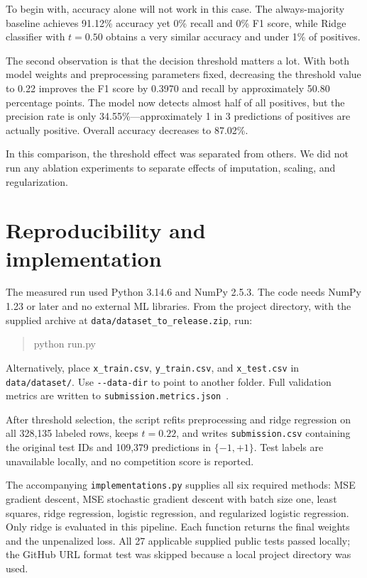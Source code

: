 \documentclass[10pt,conference,compsocconf]{IEEEtran}
\begin{document}
To begin with, accuracy alone will not work in this case. The always-majority baseline
achieves 91.12\% accuracy yet 0\% recall and 0\% F1 score, while Ridge classifier
with $t=0.50$ obtains a very similar accuracy and under 1\% of positives.

The second observation is that the decision threshold matters a lot. With both model
weights and preprocessing parameters fixed, decreasing the threshold value to 0.22
improves the F1 score by 0.3970 and recall by approximately 50.80 percentage
points. The model now detects almost half of all positives, but the precision rate is
only 34.55\%—approximately 1 in 3 predictions of positives are actually positive.
Overall accuracy decreases to 87.02\%.

In this comparison, the threshold effect was separated from others. We did not run
any ablation experiments to separate effects of imputation, scaling, and
regularization.

\section{Reproducibility and implementation}
The measured run used Python 3.14.6 and NumPy 2.5.3. The code needs NumPy 1.23 or
later and no external ML libraries. From the project directory, with the supplied
archive at \texttt{data/dataset\_to\_release.zip}, run:
\begin{quote}
\small\ttfamily
python run.py
\end{quote}
Alternatively, place \texttt{x\_train.csv}, \texttt{y\_train.csv}, and
\texttt{x\_test.csv} in \texttt{data/dataset/}. Use \texttt{-{}-data-dir} to
point to another folder. Full validation metrics are written to
\texttt{submission.metrics.json}~\cite{artifacts}.

After threshold selection, the script refits preprocessing and ridge regression
on all 328,135 labeled rows, keeps $t=0.22$, and writes \texttt{submission.csv}
containing the original test IDs and 109,379 predictions in $\{-1,+1\}$. Test
labels are unavailable locally, and no competition score is reported.

The accompanying \texttt{implementations.py} supplies all six required methods:
MSE gradient descent, MSE stochastic gradient descent with batch size one, least
squares, ridge regression, logistic regression, and regularized logistic
regression. Only ridge is evaluated in this pipeline. Each function returns the
final weights and the unpenalized loss. All 27 applicable supplied public tests
passed locally; the GitHub URL format test was skipped because a local project
directory was used.
\end{document}
